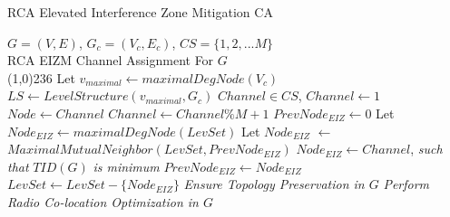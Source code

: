 \documentclass[conference]{IEEEtran}
\begin{document}
\renewcommand{\algorithmicrequire}{\textbf{Input:}}
\renewcommand{\algorithmicensure}{\textbf{Output:}}
\begin{algorithm}[htb!] 
\caption{RCA Elevated Interference Zone Mitigation CA}
\label{MaNI}
\begin{algorithmic}[1]
{\fontsize{9}{10}
\REQUIRE $G = (V,E)$, $G_c = (V_c,E_c)$, $CS =\{1, 2,...M\}$ \\
\ENSURE RCA EIZM Channel Assignment For $G$ \\
\line(1,0){236}
\STATE Let $v_{maximal} \leftarrow maximalDegNode(V_c)$
\STATE $LS \leftarrow LevelStructure(v_{maximal}, G_c)$  
\STATE	$Channel \in CS$, $Channel \leftarrow 1$
\STATE	$Node \leftarrow Channel$
\ENDFOR
\STATE	$Channel \leftarrow Channel \% M + 1$
\ENDFOR
{}
\STATE	$PrevNode_{EIZ} \leftarrow 0$ 
\STATE	Let $Node_{EIZ} \leftarrow maximalDegNode(LevSet)$ 
\ELSE 
\STATE Let $Node_{EIZ}$ $\leftarrow$ \\ $MaximalMutualNeighbor(LevSet,PrevNode_{EIZ})$
\ENDIF
\STATE	  $Node_{EIZ} \leftarrow Channel$, \textit{such that} $TID(G)$ \textit{is minimum}
\STATE    $PrevNode_{EIZ} \leftarrow Node_{EIZ}$
\STATE 	  $LevSet \leftarrow LevSet - \{Node_{EIZ}\}$
\ENDFOR
\ENDFOR
\STATE \textit{Ensure Topology Preservation in $G$} 
\STATE \textit{Perform Radio Co-location Optimization in $G$} 
}
\end{algorithmic}
\end{algorithm}
\end{document}
